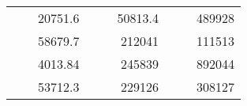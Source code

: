 \begin{table}[H]
\begin{tabular}{|ccrccrccc}
\rowcolor[HTML]{DDFDFF} 
\multicolumn{1}{|c|}{\cellcolor[HTML]{FFFFC7}}                                & \multicolumn{1}{c|}{\cellcolor[HTML]{DDFDFF}}                      & \multicolumn{1}{r|}{\cellcolor[HTML]{DAE8FC}20751.6}   & \multicolumn{1}{c|}{\cellcolor[HTML]{FFFFC7}}                                & \multicolumn{1}{c|}{\cellcolor[HTML]{DDFDFF}}                       & \multicolumn{1}{r|}{\cellcolor[HTML]{DDFDFF}50813.4}   & \multicolumn{1}{c|}{\cellcolor[HTML]{FFFFC7}}                                & \multicolumn{1}{c|}{\cellcolor[HTML]{DDFDFF}}                      & \multicolumn{1}{r|}{\cellcolor[HTML]{DDFDFF}489928}    \\ \cline{3-3} \cline{6-6} \cline{9-9} 
\multicolumn{1}{|c|}{\cellcolor[HTML]{FFFFC7}}                                & \multicolumn{1}{c|}{\cellcolor[HTML]{DDFDFF}}                      & \multicolumn{1}{r|}{\cellcolor[HTML]{DDFDFF}58679.7}   & \multicolumn{1}{c|}{\cellcolor[HTML]{FFFFC7}}                                & \multicolumn{1}{c|}{\cellcolor[HTML]{DDFDFF}}                       & \multicolumn{1}{r|}{\cellcolor[HTML]{DAE8FC}212041}    & \multicolumn{1}{c|}{\cellcolor[HTML]{FFFFC7}}                                & \multicolumn{1}{c|}{\cellcolor[HTML]{DDFDFF}}                      & \multicolumn{1}{r|}{\cellcolor[HTML]{DAE8FC}111513}    \\ \cline{3-3} \cline{6-6} \cline{9-9} 
\rowcolor[HTML]{DDFDFF} 
\multicolumn{1}{|c|}{\cellcolor[HTML]{FFFFC7}}                                & \multicolumn{1}{c|}{\cellcolor[HTML]{DDFDFF}}                      & \multicolumn{1}{r|}{\cellcolor[HTML]{DAE8FC}4013.84}   & \multicolumn{1}{c|}{\cellcolor[HTML]{FFFFC7}}                                & \multicolumn{1}{c|}{\cellcolor[HTML]{DDFDFF}}                       & \multicolumn{1}{r|}{\cellcolor[HTML]{DDFDFF}245839}    & \multicolumn{1}{c|}{\cellcolor[HTML]{FFFFC7}}                                & \multicolumn{1}{c|}{\cellcolor[HTML]{DDFDFF}}                      & \multicolumn{1}{r|}{\cellcolor[HTML]{DDFDFF}892044}    \\ \cline{3-3} \cline{6-6} \cline{9-9} 
\multicolumn{1}{|c|}{\cellcolor[HTML]{FFFFC7}}                                & \multicolumn{1}{c|}{\cellcolor[HTML]{DDFDFF}}                      & \multicolumn{1}{r|}{\cellcolor[HTML]{DDFDFF}53712.3}   & \multicolumn{1}{c|}{\cellcolor[HTML]{FFFFC7}}                                & \multicolumn{1}{c|}{\cellcolor[HTML]{DDFDFF}}                       & \multicolumn{1}{r|}{\cellcolor[HTML]{DAE8FC}229126}    & \multicolumn{1}{c|}{\cellcolor[HTML]{FFFFC7}}                                & \multicolumn{1}{c|}{\cellcolor[HTML]{DDFDFF}}                      & \multicolumn{1}{r|}{\cellcolor[HTML]{DAE8FC}308127}    \\ \cline{3-3} \cline{6-6} \cline{9-9} 

\end{tabular}
\end{table}
